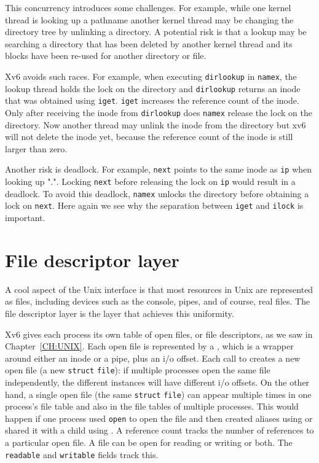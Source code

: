 This concurrency introduces some challenges. For example, while one kernel
thread is looking up a pathname another kernel thread may be changing the
directory tree by unlinking a directory.  A potential risk is that a lookup
may be searching a directory that has been deleted by another kernel thread and
its blocks have been re-used for another directory or file.

Xv6 avoids such races.  For example, when executing
\lstinline{dirlookup}
in
\lstinline{namex},
the lookup thread holds the lock on the directory and
\lstinline{dirlookup}
returns an inode that was obtained using
\lstinline{iget}.
\lstinline{iget}
increases the reference count of the inode.  Only after receiving the
inode from
\lstinline{dirlookup}
does
\lstinline{namex}
release the lock on the directory.  Now another thread may unlink the inode from
the directory but xv6 will not delete the inode yet, because the reference count
of the inode is still larger than zero.

Another risk is deadlock.  For example,
\lstinline{next}
points to the same inode as
\lstinline{ip}
when looking up ".".
Locking
\lstinline{next}
before releasing the lock on
\lstinline{ip}
would result in a deadlock.
To avoid this deadlock,
\lstinline{namex}
unlocks the directory before obtaining a lock on
\lstinline{next}.
Here again we see why the separation between
\lstinline{iget}
and
\lstinline{ilock}
is important.
\section{File descriptor layer}

A cool aspect of the Unix interface is that most resources in Unix are
represented as files, including devices such as the console, pipes, and of
course, real files.  The file descriptor layer is the layer that achieves this
uniformity.

Xv6 gives each process its own table of open files, or
file descriptors, as we saw in
Chapter~\ref{CH:UNIX}.
Each open file is represented by a
,
which is a wrapper around either an inode or a pipe,
plus an i/o offset.
Each call to 
creates a new open file (a new
\lstinline{struct}
\lstinline{file}):
if multiple processes open the same file independently,
the different instances will have different i/o offsets.
On the other hand, a single open file
(the same
\lstinline{struct}
\lstinline{file})
can appear
multiple times in one process's file table
and also in the file tables of multiple processes.
This would happen if one process used
\lstinline{open}
to open the file and then created aliases using
or shared it with a child using
.
A reference count tracks the number of references to
a particular open file.
A file can be open for reading or writing or both.
The
\lstinline{readable}
and
\lstinline{writable}
fields track this.

